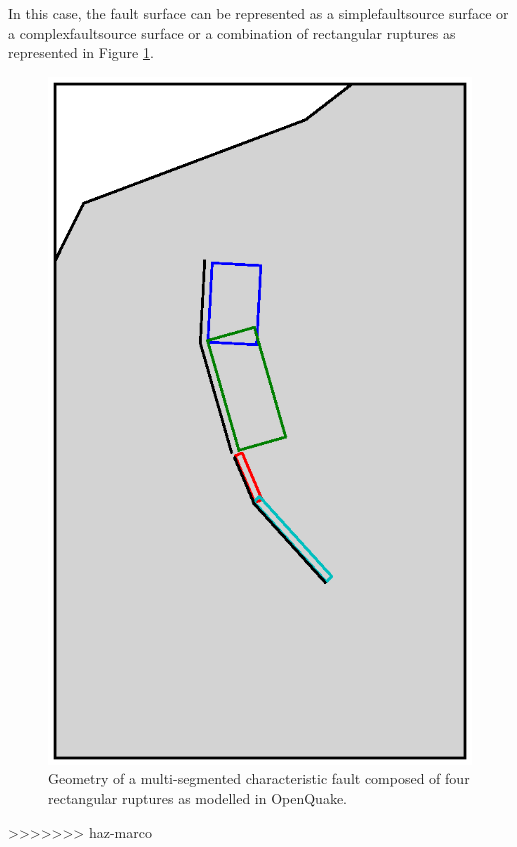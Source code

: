 \begin{itemize}
In this case, the fault surface can be represented as a 
\gls{simplefaultsource} surface or a \gls{complexfaultsource} 
surface or a combination of rectangular ruptures as represented 
in Figure \ref{fig:char_fault_source}.
\begin{figure}[!ht]
\centering
\includegraphics[width=15cm]{./figures/hazard/multi_surface.ps}
\caption{Geometry of a multi-segmented characteristic fault composed of four
	rectangular ruptures as modelled in OpenQuake.}
\label{fig:char_fault_source}
\end{figure}
>>>>>>> haz-marco
%

\end{itemize}
